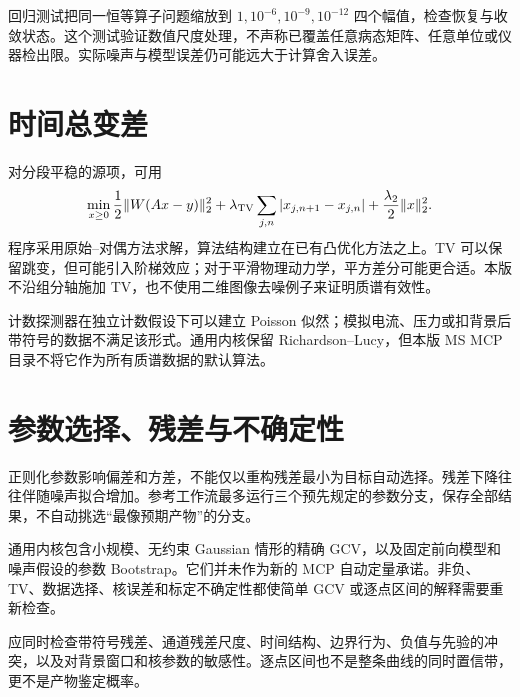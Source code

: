 回归测试把同一恒等算子问题缩放到 $1,10^{-6},10^{-9},10^{-12}$ 四个幅值，检查恢复与收敛状态。这个测试验证数值尺度处理，不声称已覆盖任意病态矩阵、任意单位或仪器检出限。实际噪声与模型误差仍可能远大于计算舍入误差。

\section{时间总变差}
对分段平稳的源项，可用
\begin{equation}
\min_{x\ge0}\frac12\|W(Ax-y)\|_2^2
+\lambda_{\rm TV}\sum_{j,n}|x_{j,n+1}-x_{j,n}|
+\frac{\lambda_2}{2}\|x\|_2^2.
\end{equation}
程序采用原始--对偶方法求解，算法结构建立在已有凸优化方法之上\cite{pdhg}。TV 可以保留跳变，但可能引入阶梯效应；对于平滑物理动力学，平方差分可能更合适。本版不沿组分轴施加 TV，也不使用二维图像去噪例子来证明质谱有效性。

计数探测器在独立计数假设下可以建立 Poisson 似然；模拟电流、压力或扣背景后带符号的数据不满足该形式。通用内核保留 Richardson--Lucy，但本版 MS MCP 目录不将它作为所有质谱数据的默认算法。

\section{参数选择、残差与不确定性}
正则化参数影响偏差和方差，不能仅以重构残差最小为目标自动选择。残差下降往往伴随噪声拟合增加。参考工作流最多运行三个预先规定的参数分支，保存全部结果，不自动挑选“最像预期产物”的分支。

通用内核包含小规模、无约束 Gaussian 情形的精确 GCV，以及固定前向模型和噪声假设的参数 Bootstrap。它们并未作为新的 MCP 自动定量承诺。非负、TV、数据选择、核误差和标定不确定性都使简单 GCV 或逐点区间的解释需要重新检查。

应同时检查带符号残差、通道残差尺度、时间结构、边界行为、负值与先验的冲突，以及对背景窗口和核参数的敏感性。逐点区间也不是整条曲线的同时置信带，更不是产物鉴定概率。
